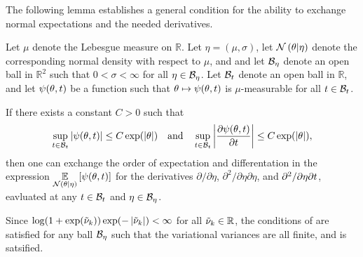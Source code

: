 The following lemma establishes a general condition for the ability
to exchange normal expectations and the needed derivatives.



\begin{lem}
%
Let $\mu$ denote the Lebesgue measure on $\mathbb{R}$. Let $\eta = (\mu,
\sigma)$, let $\mathcal{N}\left(\theta \vert \eta\right)$ denote the corresponding normal
density with respect to $\mu$, and and let $\mathcal{B}_\eta$ denote an open ball in
$\mathbb{R}^2$ such that $0 < \sigma < \infty$ for all $\eta \in \mathcal{B}_\eta$.
%
Let $\mathcal{B}_t$ denote an open ball in $\mathbb{R}$, and let $\psi(\theta, t)$
be a function such that $\theta \mapsto \psi(\theta, t)$ is $\mu$-measurable
for all $t \in \mathcal{B}_t$.

If there exists a constant $C > 0$ such that
%
\begin{align*}
%
\sup_{\t \in \ball_\t} \abs{\psi(\theta, \t)}
    \le C \exp(\abs{\theta})
\mathand
\sup_{\t \in \ball_\t}
    \abs{\frac{\partial \psi(\theta, \t)}{\partial \t}}
    \le C \exp(\abs{\theta}),
%
\end{align*}
%
then one can exchange the order of expectation and differentation in the
expression $\underset{\mathcal{N}\left(\theta \vert \eta\right)}{\mathbb{E}}\left[\psi(\theta, t)\right]$ for the
derivatives $\partial / \partial \eta$, $\partial^2 / \partial \eta \partial
\eta$, and $\partial^2 / \partial \eta  \partial t$, eavluated at any $t \in
\mathcal{B}_t$ and $\eta \in \mathcal{B}_\eta$.

\end{lem}

Since $\log (1 + \exp(\tilde{\nu}_{k})) \exp(-\left|\tilde{\nu}_{k}\right|)  < \infty$ for all $\tilde{\nu}_{k} \in
\mathbb{R}$, the conditions of  are satisfied for
any ball $\mathcal{B}_\eta$ such that the variational variances are all finite, and
 is satsified.

